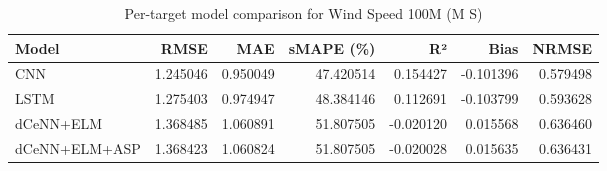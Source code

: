 \begin{table}
\caption{Per-target model comparison for Wind Speed 100M (M S)}
\begin{tabular}{lrrrrrr}
\toprule
Model & RMSE & MAE & sMAPE (\%) & R² & Bias & NRMSE \\
\midrule
CNN & 1.245046 & 0.950049 & 47.420514 & 0.154427 & -0.101396 & 0.579498 \\
LSTM & 1.275403 & 0.974947 & 48.384146 & 0.112691 & -0.103799 & 0.593628 \\
dCeNN+ELM & 1.368485 & 1.060891 & 51.807505 & -0.020120 & 0.015568 & 0.636460 \\
dCeNN+ELM+ASP & 1.368423 & 1.060824 & 51.807505 & -0.020028 & 0.015635 & 0.636431 \\
\bottomrule
\end{tabular}
\end{table}
